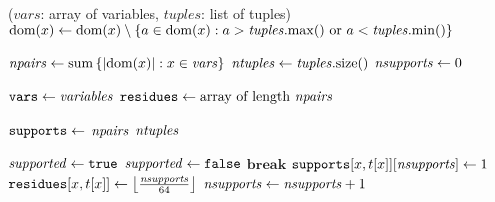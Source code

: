       \PROCEDURE \InitialiseCT($vars$: array of variables,
      $tuples$: list of tuples)
       \label{line:init:-1} %
        \STATE $\text{dom}({x}) \leftarrow \text{dom}({x}) \setminus  
        \left\{a \in \text{dom}({x}) : a > \mathit{tuples}.\mathrm{max}()
          ~\text{or}~a < \mathit{tuples}.\mathrm{min}()\right\}$
          \RETURN  \label{line:init:wipeout0}
          \ENDIF
       \ENDFOREACH \label{line:init:0}

       

      \STATE $\mathit{npairs} \leftarrow \mathrm{sum}\left\{|\text{dom}({x})| : x \in \mathit{vars}\right\}$
      \label{line:init:3}
      \STATE $\mathit{ntuples} \leftarrow \mathit{tuples}.\mathrm{size}()$ 
      \STATE $\mathit{nsupports} \leftarrow 0$  \label{line:init:4}
      
      \STATE $\texttt{vars} \leftarrow \mathit{variables}$ \label{line:init:1}
      \STATE $\texttt{residues} \leftarrow \text{array of length~} \mathit{npairs}$ \label{line:init:residue}
      
      \STATE $\texttt{supports} \leftarrow$ $\mathit{npairs}$
      $\mathit{ntuples}$ \label{line:init:5}

       \label{line:init:6}
        \STATE $\mathit{supported} \leftarrow \texttt{true}$
            \STATE $\mathit{supported} \leftarrow \texttt{false}$
            \STATE $\textbf{break}$ 
          \ENDIF
        \ENDFOREACH
             \label{line:init:9}
              \STATE $\texttt{supports}[x,t[x]][\mathit{nsupports}] \leftarrow 1$ \label{line:init:10}
              \STATE $\texttt{residues}[x,t[x]] \leftarrow \left\lfloor\frac{\mathit{nsupports}}{64}\right\rfloor$
              \label{line:init:11}
              \STATE $\mathit{nsupports} \leftarrow \mathit{nsupports} + 1$
            \ENDFOREACH
          \ENDIF
      \ENDFOREACH \label{line:init:7}

